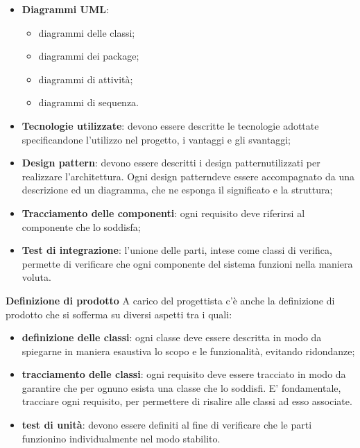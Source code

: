 			\begin{itemize}
				\item \textbf{Diagrammi UML\glo}:
				\begin{itemize}
					\item diagrammi delle classi;
					\item diagrammi dei package;
					\item diagrammi di attività;
					\item diagrammi di sequenza.
				\end{itemize}
				\item \textbf{Tecnologie utilizzate}: devono essere descritte le tecnologie adottate specificandone l'utilizzo nel progetto, i vantaggi e gli svantaggi;
				\item \textbf{Design pattern\glo}: devono essere descritti i design pattern\glosp utilizzati per realizzare l'architettura. Ogni design pattern\glosp deve essere accompagnato da una descrizione ed un diagramma, che ne esponga il significato e la struttura;
				\item \textbf{Tracciamento delle componenti}: ogni requisito deve riferirsi al componente che lo soddisfa;
				\item \textbf{Test di integrazione}: l'unione delle parti, intese come classi di verifica, permette di verificare che ogni componente del sistema funzioni nella maniera voluta.
			\end{itemize}
			\textbf{Definizione di prodotto} \newline \newline
			A carico del progettista c'è anche la definizione di prodotto che si sofferma su diversi aspetti tra i quali:
			\begin{itemize}
				\item \textbf{definizione delle classi}: ogni classe deve essere descritta in modo da spiegarne in maniera esaustiva lo scopo e le funzionalità, evitando ridondanze;
				\item \textbf{tracciamento delle classi}: ogni requisito deve essere tracciato in modo da garantire che per ognuno esista una classe che lo soddisfi. E' fondamentale, tracciare ogni requisito, per permettere di risalire alle classi ad esso associate.
				\item \textbf{test di unità}: devono essere definiti al fine di verificare che le parti funzionino individualmente nel modo stabilito.
			\end{itemize}
